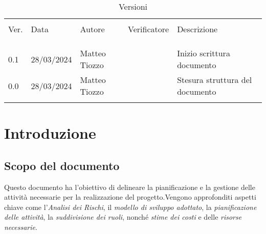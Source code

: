 \documentclass[italian,12pt]{article} %
\begin{document}


\newpage



\begin{table}[!h]
    \caption{Versioni}
    \begin{center}
        \begin{tabular}{ l l l l p{9cm} }
            \hline                                                                                 \\[-2ex]
            Ver. & Data       & Autore  & Verificatore            & Descrizione                                   \\
            \\[-2ex] \hline \\[-1.5ex]
                                  \\
            0.1  & 28/03/2024 & Matteo Tiozzo  &    & Inizio scrittura documento                    \\
            0.0  & 28/03/2024 & Matteo Tiozzo &	   & Stesura struttura del documento                           \\
            \\[-1.5ex] \hline
        \end{tabular}
    \end{center}
\end{table}

\newpage

\tableofcontents

\newpage

\listoftabelle

\newpage

\listofimmagini

\newpage

\section{Introduzione}
\setcounter{subsection}{0}
\subsection{Scopo del documento}
Questo documento ha l’obiettivo di delineare la pianificazione e la gestione delle attività necessarie per la realizzazione del progetto.Vengono approfonditi aspetti chiave come l’\textit{Analisi dei Rischi}, il \textit{modello di sviluppo adottato}, la \textit{pianificazione delle attività}, la \textit{suddivisione dei ruoli}, nonché \textit{stime dei costi} e delle \textit{risorse necessarie}.
\end{document}
